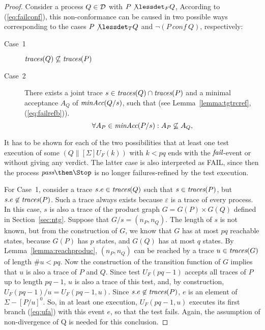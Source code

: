 \begin{proof}
Consider a process $Q\in{\cal D}$ with $P\not\lessdet_F Q$, According to
(\ref{eq:failconf}), this non-conformance can be caused in two possible ways
corresponding to the cases $P\not\lessdet_T Q$ and $\neg(P\ conf\ Q)$,
respectively:
\begin{description}
\item[Case~1] $\text{\it traces}(Q)\not\subseteq \text{\it traces}(P)$
\item[Case~2] There exists a joint trace $s\in\text{\it traces}(Q)\cap\text{\it traces}(P)$ and a minimal acceptance $A_Q$
of $\text{\it minAcc}(Q/s)$, such that
(see Lemma~\ref{lemma:tgtrcref}, (\ref{eq:failrefb})).
\begin{equation}
\label{eq:accsnotcontained}
\forall A_P\in\text{\it minAcc}(P/s): A_P\not\subseteq A_Q,
\end{equation}
\end{description}
It has to be shown for each of the two possibilities that at least one test
execution of some $(Q\parallel[\Sigma] U_F(k))$ with $k < pq$ ends with the
   ${\text{\it fail}}$-event or without giving any verdict. The latter case is also
interpreted  as FAIL, since then the process $\epass\then\Stop$ is no longer
failures-refined by the test execution.

For Case~1, consider a  trace $s.e\in\text{\it traces}(Q)$ such that $s\in\text{\it traces}(P)$, but
$s.e\not\in\text{\it traces}(P)$. Such a trace always exists because $\varepsilon$ is a
trace of every process. In this case, $s$ is also a trace of the product
graph $G = G(P)\times G(Q)$ defined in Section~\ref{sec:ntg}. Suppose that
$G/s = (n_P,n_Q)$. The length of $s$ is not known, but from the construction
of $G$,  we know that $G$ has at most $pq$ reachable states, because $G(P)$
has $p$ states, and $G(Q)$ has at most $q$ states. By
Lemma~\ref{lemma:reachproduc}, $(n_P,n_Q)$ can be reached by a trace
$u\in\text{\it traces}(G)$ of length $\#u < pq$. Now the construction of the transition
function of $G$ implies that $u$ is also a trace of $P$ and $Q$. Since test
$U_F(pq-1)$ accepts all traces of $P$ up to length $pq-1$, $u$ is also a
trace of this test, and, by construction, $U_F(pq-1)/u = U_F(pq-1,u)$. Since
$s.e\not\in\text{\it traces}(P)$, $e$ is an element of $\Sigma-[P/u]^0$. So, in at least
one execution, $U_F(pq-1,u)$ executes its first branch (\ref{eq:ufa}) with
this event $e$, so that the test fails. Again, the
assumption of non-divergence of Q is needed for this conclusion. %


\end{proof}
